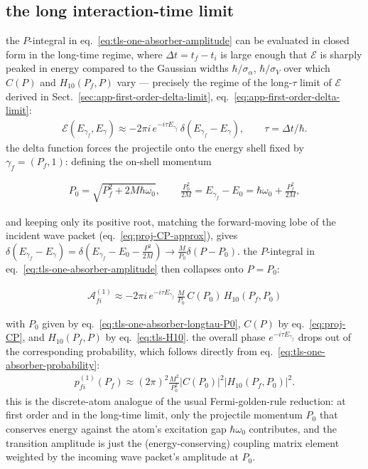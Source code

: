 \subsection{the long interaction-time limit}\label{sec:tls-one-absorber-longtau}
the $P$-integral in eq.~\eqref{eq:tls-one-absorber-amplitude} can be evaluated in closed form in the long-time regime, where $\Delta t=t_f-t_i$ is large enough that $\mathcal E$ is sharply peaked in energy compared to the Gaussian widths $\hbar/\sigma_\alpha$, $\hbar/\sigma_V$ over which $C(P)$ and $H_{10}(P_f,P)$ vary — precisely the regime of the long-$\tau$ limit of $\mathcal E$ derived in Sect.~\ref{sec:app-first-order-delta-limit}, eq.~\eqref{eq:app-first-order-delta-limit}:
\begin{align}
    \mathcal E(E_{\gamma_f},E_\gamma) \approx -2\pi i\, e^{-i\tau E_{\gamma_f}}\,\delta(E_{\gamma_f}-E_\gamma),\qquad \tau=\Delta t/\hbar.
\end{align}
the delta function forces the projectile onto the energy shell fixed by $\gamma_f=(P_f,1)$: defining the on-shell momentum
\begin{importantbox}
    \begin{align}
        P_0 = \sqrt{P_f^2+2M\hbar\omega_0},\qquad \frac{P_0^2}{2M} = E_{\gamma_f}-E_0 = \hbar\omega_0+\frac{P_f^2}{2M},\label{eq:tls-one-absorber-longtau-P0}
    \end{align}
\end{importantbox}
and keeping only its positive root, matching the forward-moving lobe of the incident wave packet (eq.~\eqref{eq:proj-CP-approx}), gives $\delta(E_{\gamma_f}-E_\gamma)=\delta\!\left(E_{\gamma_f}-E_0-\frac{P^2}{2M}\right)\to\frac{M}{P_0}\delta(P-P_0)$. the $P$-integral in eq.~\eqref{eq:tls-one-absorber-amplitude} then collapses onto $P=P_0$:
\begin{importantbox}
    \begin{align}
        \mathcal A_{fi}^{(1)} \approx -2\pi i\, e^{-i\tau E_{\gamma_f}}\,\frac{M}{P_0}\, C(P_0)\, H_{10}(P_f,P_0)\label{eq:tls-one-absorber-longtau-amplitude}
    \end{align}
\end{importantbox}
with $P_0$ given by eq.~\eqref{eq:tls-one-absorber-longtau-P0}, $C(P)$ by eq.~\eqref{eq:proj-CP}, and $H_{10}(P_f,P)$ by eq.~\eqref{eq:tls-H10}. the overall phase $e^{-i\tau E_{\gamma_f}}$ drops out of the corresponding probability, which follows directly from eq.~\eqref{eq:tls-one-absorber-probability}:
\begin{align}
    p_{fi}^{(1)}(P_f) \approx (2\pi)^2\frac{M^2}{P_0^2}\left|C(P_0)\right|^2\left|H_{10}(P_f,P_0)\right|^2.\label{eq:tls-one-absorber-longtau-probability}
\end{align}
this is the discrete-atom analogue of the usual Fermi-golden-rule reduction: at first order and in the long-time limit, only the projectile momentum $P_0$ that conserves energy against the atom's excitation gap $\hbar\omega_0$ contributes, and the transition amplitude is just the (energy-conserving) coupling matrix element weighted by the incoming wave packet's amplitude at $P_0$.

